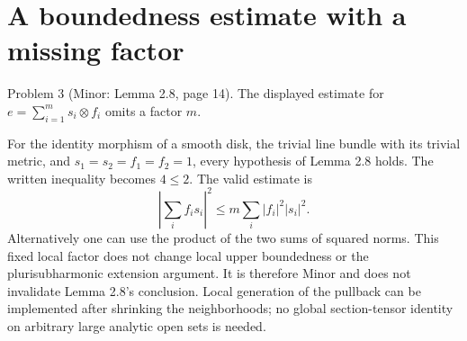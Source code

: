 \documentclass[10pt]{article}
\begin{document}
\section*{A boundedness estimate with a missing factor}
Problem 3 (Minor: Lemma 2.8, page 14).  The displayed estimate for \(e=\sum_{i=1}^m s_i\otimes f_i\) omits a factor \(m\).\par
For the identity morphism of a smooth disk, the trivial line bundle with its trivial metric, and \(s_1=s_2=f_1=f_2=1\), every hypothesis of Lemma 2.8 holds. The written inequality becomes \(4\le2\). The valid estimate is \[\left|\sum_i f_i s_i\right|^2
       \le m\sum_i |f_i|^2|s_i|^2.\] Alternatively one can use the product of the two sums of squared norms. This fixed local factor does not change local upper boundedness or the plurisubharmonic extension argument. It is therefore Minor and does not invalidate Lemma 2.8’s conclusion. Local generation of the pullback can be implemented after shrinking the neighborhoods; no global section-tensor identity on arbitrary large analytic open sets is needed.\par
\end{document}
